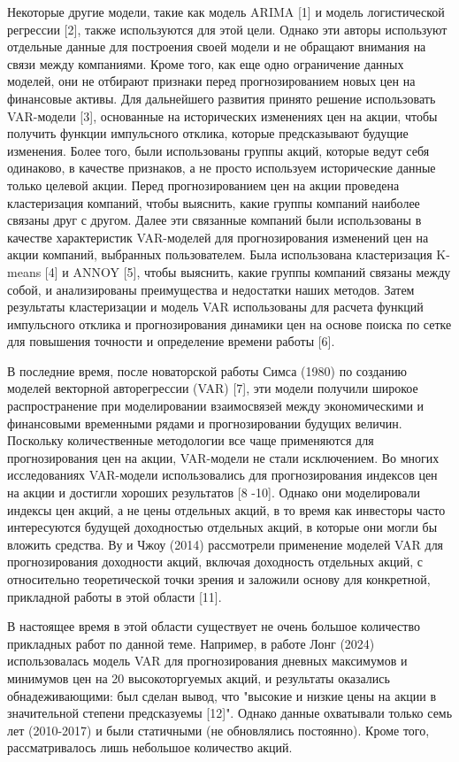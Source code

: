 {Некоторые другие модели, такие как модель ARIMA {[}1{]} и модель
логистической регрессии {[}2{]}, также используются для этой цели.
Однако эти авторы используют отдельные данные для построения своей
модели и не обращают внимания на связи между компаниями. Кроме того, как
еще одно ограничение данных моделей, они не отбирают признаки перед
прогнозированием новых цен на финансовые активы. Для дальнейшего
развития принято решение использовать VAR-модели {[}3{]}, основанные на
исторических изменениях цен на акции, чтобы получить функции импульсного
отклика, которые предсказывают будущие изменения. Более того, были
использованы группы акций, которые ведут себя одинаково, в качестве
признаков, а не просто используем исторические данные только целевой
акции. Перед прогнозированием цен на акции проведена кластеризация
компаний, чтобы выяснить, какие группы компаний наиболее связаны друг с
другом. Далее эти связанные компаний были использованы в качестве
характеристик VAR-моделей для прогнозирования изменений цен на акции
компаний, выбранных пользователем. Была использована кластеризация
K-means {[}4{]} и ANNOY {[}5{]}, чтобы выяснить, какие группы компаний
связаны между собой, и анализированы преимущества и недостатки наших
методов. Затем результаты кластеризации и модель VAR использованы для
расчета функций импульсного отклика и прогнозирования динамики цен на
основе поиска по сетке для повышения точности и определение времени
работы {[}6{]}.

В последние время, после новаторской работы Симса (1980) по созданию
моделей векторной авторегрессии (VAR) {[}7{]}, эти модели получили
широкое распространение при моделировании взаимосвязей между
экономическими и финансовыми временными рядами и прогнозировании будущих
величин. Поскольку количественные методологии все чаще применяются для
прогнозирования цен на акции, VAR-модели не стали исключением. Во многих
исследованиях VAR-модели использовались для прогнозирования индексов цен
на акции и достигли хороших результатов {[}8 -10{]}. Однако они
моделировали индексы цен акций, а не цены отдельных акций, в то время
как инвесторы часто интересуются будущей доходностью отдельных акций, в
которые они могли бы вложить средства. Ву и Чжоу (2014) рассмотрели
применение моделей VAR для прогнозирования доходности акций, включая
доходность отдельных акций, с относительно теоретической точки зрения и
заложили основу для конкретной, прикладной работы в этой области
{[}11{]}.

В настоящее время в этой области существует не очень большое количество
прикладных работ по данной теме. Например, в работе Лонг (2024)
использовалась модель VAR для прогнозирования дневных максимумов и
минимумов цен на 20 высокоторгуемых акций, и результаты оказались
обнадеживающими: был сделан вывод, что "высокие и низкие цены на акции в
значительной степени предсказуемы {[}12{]}". Однако данные охватывали
только семь лет (2010-2017) и были статичными (не обновлялись
постоянно). Кроме того, рассматривалось лишь небольшое количество акций.

}
